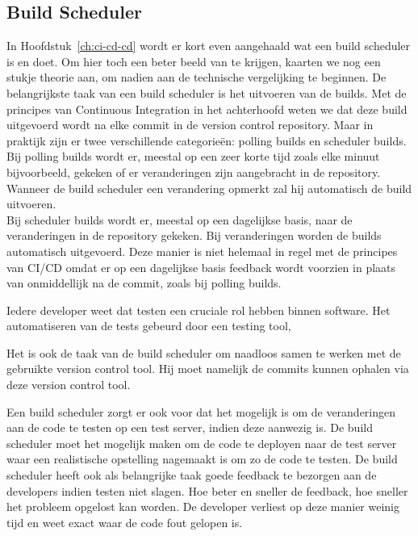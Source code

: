         \subsection{Build Scheduler}
        In Hoofdstuk~\ref{ch:ci-cd-cd} wordt er kort even aangehaald wat een build scheduler is en doet. Om hier toch een beter beeld van te krijgen, kaarten we nog een stukje theorie aan, om nadien aan de technische vergelijking te beginnen.
        De belangrijkste taak van een build scheduler is het uitvoeren van de builds. Met de principes van Continuous Integration in het achterhoofd weten we dat deze build uitgevoerd wordt na elke commit in de version control repository. Maar in praktijk zijn er twee verschillende categorieën: polling builds en scheduler builds.\\
        Bij polling builds wordt er, meestal op een zeer korte tijd zoals elke minuut bijvoorbeeld, gekeken of er veranderingen zijn aangebracht in de repository. Wanneer de build scheduler een verandering opmerkt zal hij automatisch de build uitvoeren.\\
        Bij scheduler builds wordt er, meestal op een dagelijkse basis, naar de veranderingen in de repository gekeken. Bij veranderingen worden de builds automatisch uitgevoerd. Deze manier is niet helemaal in regel met de principes van CI/CD omdat er op een dagelijkse basis feedback wordt voorzien in plaats van onmiddellijk na de commit, zoals bij polling builds.
        
        Iedere developer weet dat testen een cruciale rol hebben binnen software. Het automatiseren van de tests gebeurd door een testing tool, %
        
        Het is ook de taak van de build scheduler om naadloos samen te werken met de gebruikte version control tool. Hij moet namelijk de commits kunnen ophalen via deze version control tool.
        
        Een build scheduler zorgt er ook voor dat het mogelijk is om de veranderingen aan de code te testen op een test server, indien deze aanwezig is. De build scheduler moet het mogelijk maken om de code te deployen naar de test server waar een realistische opstelling nagemaakt is om zo de code te testen.
        De build scheduler heeft ook als belangrijke taak goede feedback te bezorgen aan de developers indien testen niet slagen. Hoe beter en sneller de feedback, hoe sneller het probleem opgelost kan worden. De developer verliest op deze manier weinig tijd en weet exact waar de code fout gelopen is.
        
